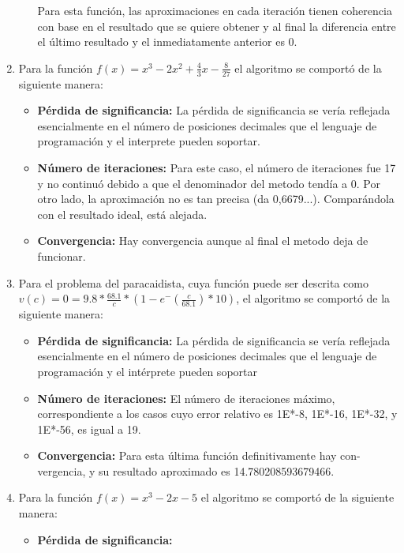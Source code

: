\documentclass{article}
\begin{document}
\begin{enumerate}
\begin{itemize}
        Para esta función, las aproximaciones en cada iteración tienen coherencia con base en el resultado que se quiere obtener y al final la diferencia entre el último resultado y el inmediatamente anterior es 0. 
    \end{itemize}
    \item Para la función \(f(x) = x^3-2x^2+\frac{4}{3}x-\frac{8}{27}\) el algoritmo se comportó de la siguiente manera:
    \begin{itemize}
        \item \textbf{Pérdida de significancia:}
        La pérdida de significancia se vería reflejada esencialmente en el número de posiciones decimales que el lenguaje de programación y el interprete pueden soportar.
        \item \textbf{Número de iteraciones:}
        Para este caso, el número de iteraciones fue 17 y no continuó debido a que el denominador del metodo tendía a 0. Por otro lado, la aproximación no es tan precisa (da 0,6679...). Comparándola con el resultado ideal, está alejada.
        \item \textbf{Convergencia:}
        Hay  convergencia aunque al final el metodo deja de funcionar.
    \end{itemize}
    \item Para el problema del paracaidista, cuya función puede ser descrita como \(v(c) = 0 = 9.8* \frac{68.1}{c}*(1-e^-(\frac{c}{68.1})*10)\), el algoritmo se comportó de la siguiente manera:
    \begin{itemize}
        \item \textbf{Pérdida de significancia:}
        La pérdida de significancia se vería reflejada esencialmente en el número de posiciones decimales que el lenguaje de programación y el intérprete pueden soportar
        \item \textbf{Número de iteraciones:}
        El número de iteraciones máximo, correspondiente a los casos cuyo error relativo es 1E*-8, 1E*-16, 1E*-32, y 1E*-56, es igual a 19.
        \item \textbf{Convergencia:}
        Para  esta última función definitivamente hay con- vergencia, y su resultado  aproximado es 14.780208593679466.
    \end{itemize}
    \item Para la función \(f(x) = x^3-2x-5 \) el algoritmo se comportó de la siguiente manera:
    \begin{itemize}
        \item \textbf{Pérdida de significancia:}

\end{itemize}
\end{enumerate}
\end{document}
